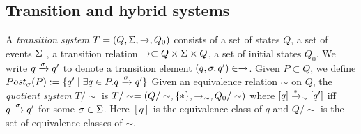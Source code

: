 \subsection{Transition and hybrid systems}
\label{sec:transition systems}

%
\begin{defn}
	\label{defn:transition system}
	A \emph{transition system} $T = (Q,\Sigma,\xrightarrow{},Q_0)$ consists of a set of states $Q$, a set of events $\Sigma$ , a transition relation $\xrightarrow{} \subset Q \times \Sigma \times Q$, a set of initial states $Q_0$. 
	We write $q \xrightarrow{\sigma}q'$ to denote a transition element $(q,\sigma,q') \in \xrightarrow{}$.
	Given $P\subset Q$, we define $Post_\sigma(P) := \{q'\;|\;\exists q\in P. q \xrightarrow{\sigma}q'\}$
	Given an equivalence relation $\sim$ on $Q$, the \emph{quotient system} $T/\sim$ is
	$T/\sim = (Q/\sim, \{*\}, \xrightarrow{}_\sim, Q_0/\sim)$
	where $[q] \xrightarrow{*}_\sim [q']$ iff $q \xrightarrow{\sigma} q'$ for some $\sigma \in \Sigma$.
	Here $[q]$ is the equivalence class of $q$ and $Q/\sim$ is the set of equivalence classes of $\sim$.
\end{defn}

